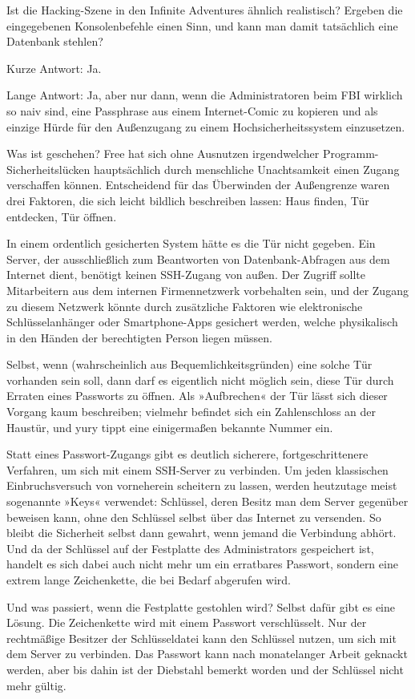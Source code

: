 Ist die Hacking-Szene in den Infinite Adventures ähnlich realistisch? Ergeben die eingegebenen Konsolenbefehle einen Sinn, und kann man damit tatsächlich eine Datenbank stehlen?

Kurze Antwort: Ja.

Lange Antwort: Ja, aber nur dann, wenn die Administratoren beim FBI wirklich so naiv sind, eine Passphrase aus einem Internet-Comic zu kopieren und als einzige Hürde für den Außenzugang zu einem Hochsicherheitssystem einzusetzen.

Was ist geschehen? Free hat sich ohne Ausnutzen irgendwelcher Programm-Sicherheitslücken hauptsächlich durch menschliche Unachtsamkeit einen Zugang verschaffen können. Entscheidend für das Überwinden der Außengrenze waren drei Faktoren, die sich leicht bildlich beschreiben lassen: Haus finden, Tür entdecken, Tür öffnen.

In einem ordentlich gesicherten System hätte es die Tür nicht gegeben. Ein Server, der ausschließlich zum Beantworten von Datenbank-Abfragen aus dem Internet dient, benötigt keinen SSH-Zugang von außen. Der Zugriff sollte Mitarbeitern aus dem internen Firmennetzwerk vorbehalten sein, und der Zugang zu diesem Netzwerk könnte durch zusätzliche Faktoren wie elektronische Schlüsselanhänger oder Smartphone-Apps gesichert werden, welche physikalisch in den Händen der berechtigten Person liegen müssen.

Selbst, wenn (wahrscheinlich aus Bequemlichkeitsgründen) eine solche Tür vorhanden sein soll, dann darf es eigentlich nicht möglich sein, diese Tür durch Erraten eines Passworts zu öffnen. Als »Aufbrechen« der Tür lässt sich dieser Vorgang kaum beschreiben; vielmehr befindet sich ein Zahlenschloss an der Haustür, und yury tippt eine einigermaßen bekannte Nummer ein.

Statt eines Passwort-Zugangs gibt es deutlich sicherere, fortgeschrittenere Verfahren, um sich mit einem SSH-Server zu verbinden. Um jeden klassischen Einbruchsversuch von vorneherein scheitern zu lassen, werden heutzutage meist sogenannte »Keys« verwendet: Schlüssel, deren Besitz man dem Server gegenüber beweisen kann, ohne den Schlüssel selbst über das Internet zu versenden. So bleibt die Sicherheit selbst dann gewahrt, wenn jemand die Verbindung abhört. Und da der Schlüssel auf der Festplatte des Administrators gespeichert ist, handelt es sich dabei auch nicht mehr um ein erratbares Passwort, sondern eine extrem lange Zeichenkette, die bei Bedarf abgerufen wird.

Und was passiert, wenn die Festplatte gestohlen wird? Selbst dafür gibt es eine Lösung. Die Zeichenkette wird mit einem Passwort verschlüsselt. Nur der rechtmäßige Besitzer der Schlüsseldatei kann den Schlüssel nutzen, um sich mit dem Server zu verbinden. Das Passwort kann nach monatelanger Arbeit geknackt werden, aber bis dahin ist der Diebstahl bemerkt worden und der Schlüssel nicht mehr gültig.

